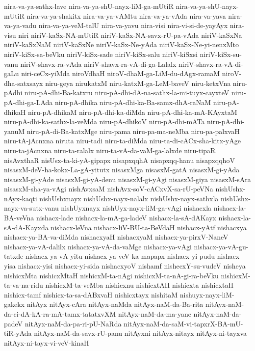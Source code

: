 {nira-va-ya-sathx-lave
nira-va-ya-shU-nayx-liM-ga-mUtiR
nira-va-ya-shU-nayx-mUtiR
nira-va-ya-shakitx
nira-va-ya-vAMtu
nira-va-ya-vAda
nira-va-yava
nira-va-ya-vadu
nira-va-ya-veM-talU
nira-va-yavu
nira-visi
nira-vi-si-de-yayAyx
nira-visu
niri
niriV-kaSx-NA-mUtiR
niriV-kaSx-NA-savx-rU-pa-vAda
niriV-kaSxNa
niriV-kaSxNaM
niriV-kaSxNe
niriV-kaSx-Ne-yAda
niriV-kaSx-Ne-yi-nenxMto
niriV-kiSx-sa-beVku
niriV-kiSx-sade
niriV-kiSx-salu
niriV-kiSxsi
niriV-kiSx-su-vanu
niriV-shavx-ra-vAda
niriV-shavx-ra-vA-di-ga-Lalalx
niriV-shavx-ra-vA-di-gaLu
niri-ceCx-yiMda
niroVdhaH
niroV-dhaM-ga-LiM-du-dAgx-ramaM
niroV-dha-satxsayx
niru-geya
nirukatxM
niru-katxM-ga-LeM-baveV
niru-ketxVna
niru-pAdhi
niru-pA-dhi-Ba-katxru
niru-pA-dhi-dA-na-sathx-la-mi-tuyx-cayxteV
niru-pA-dhi-ga-LAda
niru-pA-dhika
niru-pA-dhi-ka-Ba-samx-dhA-raNaM
niru-pA-dhikaH
niru-pA-dhikaM
niru-pA-dhi-ka-diMda
niru-pA-dhi-ka-mA-KAyxtaM
niru-pA-dhi-ka-sathx-la-veMda
niru-pA-dhikoV
niru-pA-dhi-mATa
niru-pA-dhi-yanuM
niru-pA-di-Ba-katxMge
niru-pama
niru-pa-ma-neMba
niru-pa-palxvaH
niru-tA-jAcnxna
niruta
niru-tadi
niru-ta-diMda
niru-ta-di-cACx-sha-kitx-yAge
niru-ta-jAcnxna
niru-ta-ralalx
niru-ta-vA-da-vaM-ga-lalxde
niru-tipaR
nisAvxthaR
nisUsx-ta-ki-yA-gipapx
nisapxqqhA
nisapxqq-hanu
nisapxqqhoV
nisasxM-deV-ha-kokx-La-gA-yitutx
nisasxMga
nisasxM-gatA
nisasxM-gi-yAda
nisasxM-gi-yAde
nisasxM-gi-yA-denu
nisasxM-gi-yAgi
nisasxM-giya
nisasxM-sAra
nisasxM-sha-ya-vAgi
nishAvxsaM
nishAvx-soV-cACxvX-sa-rU-peVNa
nishUshx-nAyx-kaqti
nishUshxnayx
nishUshx-nayx-nalalx
nishUshx-nayx-sathxla
nishUshx-nayx-va-sutx-vanu
nishUyxnayx
nishUyx-nayx-liM-ga-vAgi
nishacxla
nishacx-la-BA-veVna
nishacx-lade
nishacx-la-mA-ga-ladeV
nishacx-la-sA-dAKayx
nishacx-la-sA-dA-Kayxda
nishacx-leVna
nishacx-liV-BU-ta-BeVdaH
nishacx-yAtf
nishacxya
nishacx-ya-BA-va-diMda
nishacxyaH
nishacxyaM
nishacx-ya-pirxV-NaneV
nishacx-ya-vA-dalilx
nishacx-ya-vA-da-vaMge
nishacx-ya-vAgi
nishacx-ya-vA-gu-tatxde
nishacx-ya-vA-yitu
nishacx-ya-veV-ka-mapapx
nishacx-yi-pudu
nishacx-yisa
nishacx-yisi
nishacx-yi-sida
nishacxyoV
nishamf
nishecxY-su-vudeV
nisheya
nishicxMta
nishicxMtaH
nishicxM-ta-nAgi
nishicxM-ta-nA-gi-ra-beVku
nishicxM-ta-va-na-ridu
nishicxM-ta-veMba
nishicxnu
nishicxtAH
nishicxta
nishicxtaH
nishicx-tamf
nishicx-ta-sa-dABxvaH
nishicxtayx
nishitaM
nishuyx-nayx-liM-gakekx
nitAyx
nitAyx-cAra
nitAyx-naMda
nitAyx-naM-da-Ba-rita
nitAyx-naM-da-ci-dA-kA-ra-mA-tamx-tatatxvXM
nitAyx-naM-da-ma-yane
nitAyx-naM-da-padeV
nitAyx-naM-da-pa-ri-pU-NaRda
nitAyx-naM-da-saM-vi-tapxrX-BA-mU-tiR-yAda
nitAyx-naM-da-savx-rU-panu
nitAyxni
nitAyx-nitayx
nitAyx-ni-tayxva
nitAyx-ni-tayx-vi-veV-kinaH
}
